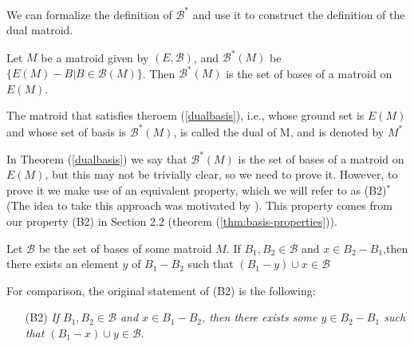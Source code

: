 

We can formalize the definition of $\mathcal{B}^*$ and use it to construct the definition of the dual matroid.

\begin{theorem}\label{dualbasis}
    Let $M$ be a matroid given by $(E,\mathcal{B})$, and $\mathcal{B}^*(M)$ be $\{E(M) - B|B\in \mathcal{B}(M)\}$. Then $\mathcal{B}^*(M)$ is the set of bases of a matroid on $E(M)$.
\end{theorem}

\begin{defn}
     The matroid that satisfies theroem (\ref{dualbasis}), i.e., whose ground set is $E(M)$ and whose set of basis is $\mathcal{B}^*(M)$, is called the dual of M, and is denoted by $M^*$
\end{defn}

In Theorem (\ref{dualbasis}) we say that $\mathcal{B}^*(M)$ is the set of bases of a matroid on $E(M)$, but this may not be trivially clear, so we need to prove it. However, to prove it we make use of an equivalent property, which we will refer to as (B2)$^*$ (The idea to take this approach was motivated by \cite[p. 64]{oxley1}). This property comes from our property (B2) in Section 2.2 (theorem (\ref{thm:basis-properties})).

\begin{lemma}[(B2)$^*$]\label{B2Dual}
    Let $\mathcal{B}$ be the set of bases of some matroid $M$. If $B_1, B_2 \in \mathcal{B}$ and $x \in B_2 - B_1$,then there exists an element $y$ of $B_1 - B_2$ such that $(B_1 - y) \cup x \in \mathcal{B}$
\end{lemma}

For comparison, the original statement of (B2) is the following:
\begin{enumerate}
    \item[(B2)] \textit{If $B_1,B_2\in \mathcal{B}$ and $x\in B_1 - B_2$, then there exists some $y\in B_2 - B_1$ such that $(B_1 - x)\cup y \in \mathcal{B}$}.
\end{enumerate}

